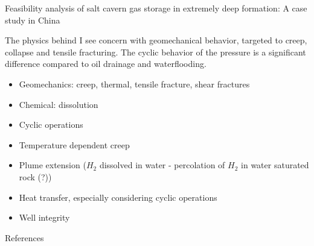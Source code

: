 \begin{frame}{\cite{zhao22} Feasibility analysis of salt cavern gas storage in extremely deep formation: A case study in China}
\end{frame}
%
%
\begin{frame}{The physics behind}
I see concern with geomechanical behavior, targeted to creep, collapse and tensile fracturing. The cyclic behavior of the pressure is a significant difference compared to oil drainage and waterflooding.
\begin{itemize}
\item Geomechanics: creep, thermal, tensile fracture, shear fractures
\item Chemical: dissolution
\item Cyclic operations
\item Temperature dependent creep
\item Plume extension ($H_2$ dissolved in water - percolation of $H_2$ in water saturated rock (?))
\item Heat transfer, especially considering cyclic operations
\item Well integrity
\end{itemize}
\end{frame}

\begin{frame}[shrink=50,fragile]{References}


\end{frame}
